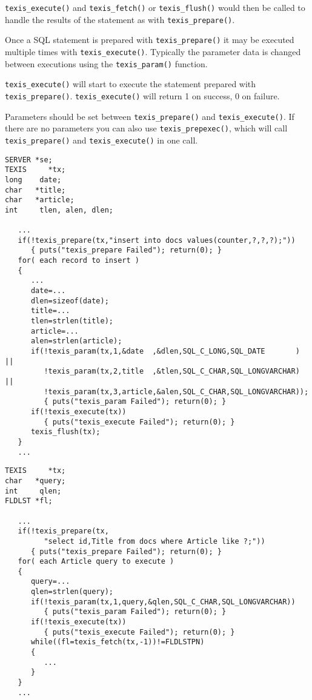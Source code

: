 \verb`texis_execute()` and \verb`texis_fetch()` or \verb`texis_flush()` would
then be called to handle the results of the statement as with \verb`texis_prepare()`.

Once a SQL statement is prepared with \verb`texis_prepare()` it may be
executed multiple times with \verb`texis_execute()`. Typically the parameter
data is changed between executions using the \verb`texis_param()` function.

\verb`texis_execute()` will start to execute the statement prepared with
\verb`texis_prepare()`.  \verb`texis_execute()` will return 1
on success, 0 on failure.

Parameters should be set between \verb`texis_prepare()` and
\verb`texis_execute()`.  If there are no parameters you can also use
\verb`texis_prepexec()`, which will call \verb`texis_prepare()` and
\verb`texis_execute()` in one call.

\EXAMPLE
\begin{verbatim}
SERVER *se;
TEXIS     *tx;
long    date;
char   *title;
char   *article;
int     tlen, alen, dlen;

   ...
   if(!texis_prepare(tx,"insert into docs values(counter,?,?,?);"))
      { puts("texis_prepare Failed"); return(0); }
   for( each record to insert )
   {
      ...
      date=...
      dlen=sizeof(date);
      title=...
      tlen=strlen(title);
      article=...
      alen=strlen(article);
      if(!texis_param(tx,1,&date  ,&dlen,SQL_C_LONG,SQL_DATE       ) ||
         !texis_param(tx,2,title  ,&tlen,SQL_C_CHAR,SQL_LONGVARCHAR) ||
         !texis_param(tx,3,article,&alen,SQL_C_CHAR,SQL_LONGVARCHAR));
         { puts("texis_param Failed"); return(0); }
      if(!texis_execute(tx))
         { puts("texis_execute Failed"); return(0); }
      texis_flush(tx);
   }
   ...
\end{verbatim}

\EXAMPLE
\begin{verbatim}
TEXIS     *tx;
char   *query;
int     qlen;
FLDLST *fl;

   ...
   if(!texis_prepare(tx,
         "select id,Title from docs where Article like ?;"))
      { puts("texis_prepare Failed"); return(0); }
   for( each Article query to execute )
   {
      query=...
      qlen=strlen(query);
      if(!texis_param(tx,1,query,&qlen,SQL_C_CHAR,SQL_LONGVARCHAR))
         { puts("texis_param Failed"); return(0); }
      if(!texis_execute(tx))
         { puts("texis_execute Failed"); return(0); }
      while((fl=texis_fetch(tx,-1))!=FLDLSTPN)
      {
         ...
      }
   }
   ...
\end{verbatim}

